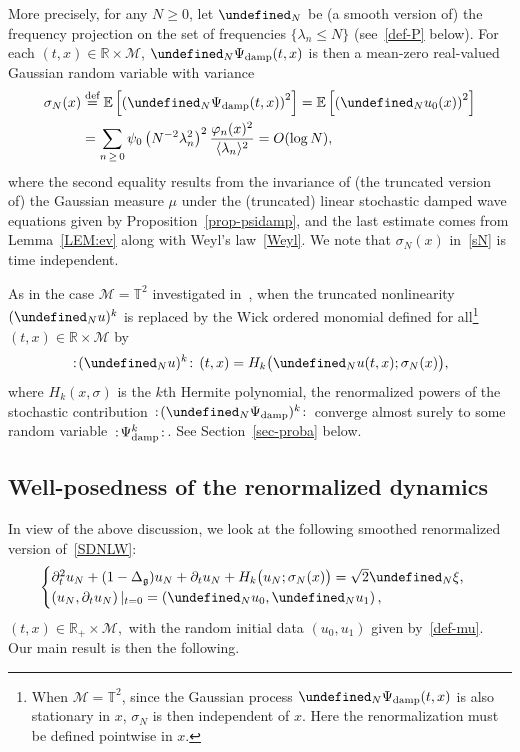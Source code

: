 \documentclass[10pt]{amsart}
\theoremstyle{definition}\newtheorem{defi}[theo]{Definition}\newtheorem{rema}[theo]{Remark}\newtheorem{exam}[theo]{Example}\newtheorem{exem}[theo]{Example}\newtheorem{nota}[theo]{Notation}
\newcommand{\damp}{\textup{damp}}
\newcommand{\R}{\mathbb{R}}
\newcommand{\T}{\mathbb{T}}
\newcommand{\E}{\mathbb{E}}
\newcommand{\deff}{\overset{\textup{def}}{=}}
\let\P= \undefined
\newcommand{\P}{\mathbf{P}}
\newcommand{\M}{\mathcal{M}}
\newcommand{\g}{\mathfrak{g}}
\newcommand{\Dlg}{\Delta_{\g}}
\newcommand{\s}{\sigma}
\newcommand{\dt}{\partial_t}
\newcommand{\jb}[1] {\langle #1 \rangle}
\begin{document}
More precisely, for any $N\geq 0$, let $\P_N$ be (a smooth version of) the frequency projection on the set of frequencies $\{\lambda_n\leq N\}$ (see~\eqref{def-P} below). For each $(t,x) \in \R\times \M$, $\P_N \Psi_{\damp}(t,x)$ is then a mean-zero real-valued Gaussian random variable with variance
\begin{equation}\label{sN}
\begin{split}
\s_N(x) &\deff \E \left[\left(\P_N \Psi_{\damp}(t,x)\right)^2\right] = \E\left[\left(\P_Nu_0(x)\right)^2\right]\\
&= \sum_{n\,\geq\,0}\psi_0\left(N^{-2}\lambda_n^2\right)^2\frac{\varphi_n(x)^2}{\jb{\lambda_n}^2} = O(\log N),
\end{split}
\end{equation}
where the second equality results from the invariance of (the truncated version of) the Gaussian measure $\mu$ under the (truncated) linear stochastic damped wave equations given by Proposition~\ref{prop-psidamp}, and the last estimate comes from Lemma~\ref{LEM:ev} along with Weyl's law~\eqref{Weyl}. We note that $\s_N(x)$ in~\eqref{sN} is time independent.

As in the case $\M=\T^2$ investigated in~\cite{OT1,OT2,GKO}, when the truncated nonlinearity $(\P_Nu)^k$ is replaced by the Wick ordered monomial defined for all\footnote{ When $\M = \T^2$, since the Gaussian process $\P_N\Psi_{\damp}(t,x)$ is also stationary in $x$, $\s_N$ is then independent of $x$. Here the renormalization must be defined pointwise in $x$.} $(t,x)\in\R\times\M$ by
\begin{equation}\label{Wick1}
\,:\!(\P_Nu)^{k}\!:\,(t,x)=H_{k}\big(\P_Nu(t,x);\s_N(x)\big),
\end{equation}
where $H_{k}(x,\s)$ is the $k$th Hermite polynomial, the renormalized powers of the stochastic contribution $\,:\!(\P_N\Psi_{\damp})^k\!:\,$ converge almost surely to some random variable $\,:\!\Psi_{\damp}^k\!:\,$. See Section~\ref{sec-proba} below.

\subsection{Well-posedness of the renormalized dynamics}

In view of the above discussion, we look at the following smoothed renormalized version of~\eqref{SDNLW}:
\begin{multline}\label{trunc-SDNLW}
\begin{cases}
\dt^2 u_N + (1- \Dlg) u_N + \dt u_N + H_k\big(u_N;\s_N(x)\big) = \sqrt{2}\P_N\xi, \\
\left(u_N,\dt u_N\right)|_{t=0}=\left(\P_Nu_0,\P_Nu_1\right),
\end{cases}
\end{multline}
$(t,x)\in \R_+\times\M,$ with the random initial data $(u_0,u_1)$ given by~\eqref{def-mu}. Our main result is then the following.
\end{document}
